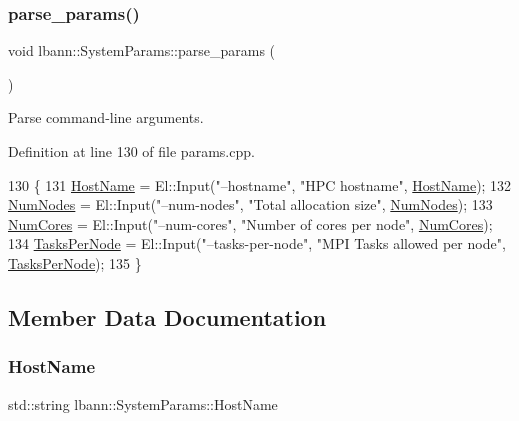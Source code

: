 \subsubsection{\texorpdfstring{parse\+\_\+params()}{parse\_params()}}
{\footnotesize\ttfamily void lbann\+::\+System\+Params\+::parse\+\_\+params (\begin{DoxyParamCaption}{ }\end{DoxyParamCaption})}



Parse command-\/line arguments. 



Definition at line 130 of file params.\+cpp.


\begin{DoxyCode}
130                                      \{
131   \hyperlink{classlbann_1_1SystemParams_a4aa517715ee0a454ee7ca2cc23fe30ee}{HostName} = El::Input(\textcolor{stringliteral}{"--hostname"}, \textcolor{stringliteral}{"HPC hostname"}, \hyperlink{classlbann_1_1SystemParams_a4aa517715ee0a454ee7ca2cc23fe30ee}{HostName});
132   \hyperlink{classlbann_1_1SystemParams_ad63e9fea31313d45d13298e35b47982a}{NumNodes} = El::Input(\textcolor{stringliteral}{"--num-nodes"}, \textcolor{stringliteral}{"Total allocation size"}, \hyperlink{classlbann_1_1SystemParams_ad63e9fea31313d45d13298e35b47982a}{NumNodes});
133   \hyperlink{classlbann_1_1SystemParams_aa4f76625da59edc74b6d9208cb60a3db}{NumCores} = El::Input(\textcolor{stringliteral}{"--num-cores"}, \textcolor{stringliteral}{"Number of cores per node"}, 
      \hyperlink{classlbann_1_1SystemParams_aa4f76625da59edc74b6d9208cb60a3db}{NumCores});
134   \hyperlink{classlbann_1_1SystemParams_a93758103d73bcd95146f99464203aa86}{TasksPerNode} = El::Input(\textcolor{stringliteral}{"--tasks-per-node"}, \textcolor{stringliteral}{"MPI Tasks allowed per node"}, 
      \hyperlink{classlbann_1_1SystemParams_a93758103d73bcd95146f99464203aa86}{TasksPerNode});
135 \}
\end{DoxyCode}


\subsection{Member Data Documentation}
\mbox{\label{classlbann_1_1SystemParams_a4aa517715ee0a454ee7ca2cc23fe30ee}} 
\subsubsection{\texorpdfstring{Host\+Name}{HostName}}
{\footnotesize\ttfamily std\+::string lbann\+::\+System\+Params\+::\+Host\+Name}



